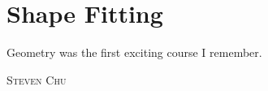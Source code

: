 \chapter{Shape Fitting} 
\label{chap:ShapeFitting}

\epigraph{Geometry was the first exciting course I remember.}
{\textsc{Steven Chu}}

\pagebreak






